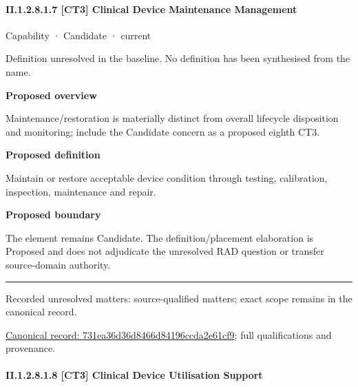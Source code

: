 \paragraph*{II.1.2.8.1.7 [CT3] Clinical Device Maintenance Management}
\label{navigation:II.1.2.8.1.7}

\label{element:731ea36d36d8466d84196ccda2e61cf9}
{\small Capability · Candidate · current}\par

Definition unresolved in the baseline. No definition has been synthesised from the name.



\textbf{Proposed overview}



Maintenance/restoration is materially distinct from overall lifecycle disposition and monitoring; include the Candidate concern as a proposed eighth CT3.



\textbf{Proposed definition}



Maintain or restore acceptable device condition through testing, calibration, inspection, maintenance and repair.



\textbf{Proposed boundary}



The element remains Candidate. The definition/placement elaboration is Proposed and does not adjudicate the unresolved RAD question or transfer source-domain authority.



\medskip\hrule\medskip

{\small Recorded unresolved matters: source-qualified matters; exact scope remains in the canonical record.}\par
{\footnotesize \href{../../../../../../../continuum/strategy/capability/731ea36d36d8466d84196ccda2e61cf9.md}{Canonical record: 731ea36d36d8466d84196ccda2e61cf9}; full qualifications and provenance.}\par
\paragraph*{II.1.2.8.1.8 [CT3] Clinical Device Utilisation Support}
\label{navigation:II.1.2.8.1.8}

